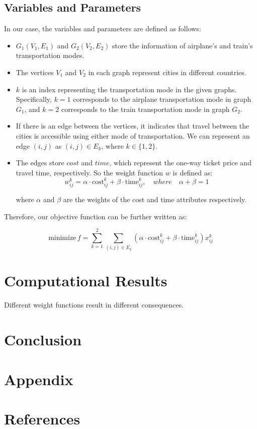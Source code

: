 \documentclass[11pt]{article}
\begin{document}
\subsection*{Variables and Parameters}
In our case, the variables and parameters are defined as follows:
\begin{itemize}
  \item $G_1(V_1, E_1)$ and $G_2(V_2, E_2)$ store the information of airplane's and train's transportation modes.
  \item The vertices $V_1$ and $V_2$ in each graph represent cities in different countries.
  \item $k$ is an index representing the transportation mode in the given graphs. Specifically, $k = 1$ corresponds to the airplane transportation mode in graph $G_1$, and $k = 2$ corresponds to the train transportation mode in graph $G_2$.
  \item If there is an edge between the vertices, it indicates that travel between the cities is accessible using either mode of transportation. We can represent an edge $(i, j)$ as $(i, j) \in E_k$, where $k \in \{1, 2\}$.
  \item The edges store $cost$ and $time$, which represent the one-way ticket price and travel time, respectively. So the weight function $w$ is defined as:
\begin{equation*}
w_{ij}^k = \alpha \cdot \text{cost}_{ij}^k + \beta \cdot \text{time}_{ij}^k, \quad where \quad \alpha + \beta = 1
\end{equation*}

where $\alpha$ and $\beta$ are the weights of the cost and time attributes respectively. 

\end{itemize}
Therefore, our objective function can be further written as:

\begin{equation*}
\text{minimize}\, f = \sum_{k=1}^{2} \sum_{(i,j) \in E_k} (\alpha \cdot \text{cost}_{ij}^k + \beta \cdot \text{time}_{ij}^k) x_{ij}^k
\end{equation*}

\section{Computational Results}
Different weight functions result in different
consequences\cite{lamport1994latex}.
\section{Conclusion}
\section{Appendix}
\section{References}
\printbibliography[heading=none]
\end{document}
